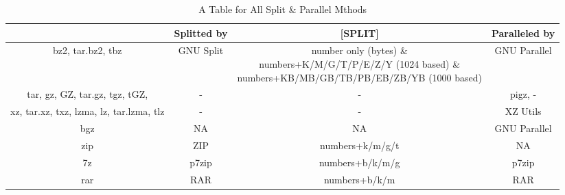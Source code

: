 \documentclass[fleqn,10pt]{SelfArx} %
\begin{document}
\begin{table}
\centering
\begin{tabular}{|c|c|c|c|}
\hline\hline
[EXT] & Splitted by & [SPLIT] & Paralleled by \\\hline\hline
bz2, tar.bz2, tbz & GNU Split &\parbox{7cm}{number only (bytes) \&\\ numbers+K/M/G/T/P/E/Z/Y (1024 based) \&\\  numbers+KB/MB/GB/TB/PB/EB/ZB/YB (1000 based)} & GNU Parallel \\\hline
tar, gz, GZ, tar.gz, tgz, tGZ,& - & - & pigz, - \\\hline
xz, tar.xz, txz, lzma, lz, tar.lzma, tlz & - & - & XZ Utils \\\hline
bgz & NA & NA & GNU Parallel\\\hline
zip & ZIP & numbers+k/m/g/t & NA \\\hline
7z & p7zip & numbers+b/k/m/g & p7zip \\\hline
rar & RAR & numbers+b/k/m & RAR \\\hline\hline
\end{tabular}
\caption{A Table for All Split \& Parallel Mthods}
\label{tbl:AllSplit}
\end{table}
\newpage
\twocolumn
\end{document}
